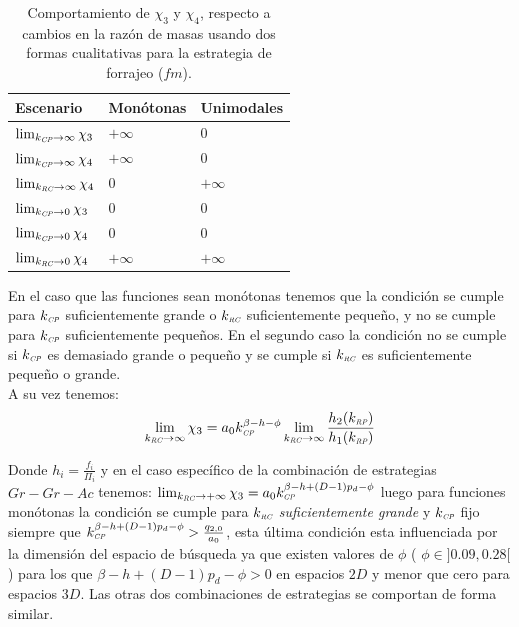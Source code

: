 \begin{table}

\caption{Comportamiento de $\chi_3$ y $\chi_4$, respecto a cambios en la raz\'on de masas usando dos formas cualitativas para la estrategia de forrajeo ($fm$).}
\begin{center}
\begin{tabular}{p{1.5in}|m{1.5in}|m{1.5in}} 
 Escenario & Mon\'otonas  & Unimodales \\
\hline
$\lim_{k_{\textit{\tiny CP}} \to \infty} \chi_3$ & $+\infty$  & 0 \\
$\lim_{k_{\textit{\tiny CP}} \to \infty} \chi_4$ & $+\infty$  & 0 \\
$\lim_{k_{\textit{\tiny RC}} \to \infty} \chi_4$ & 0  & $+\infty$ \\
$\lim_{k_{\textit{\tiny CP}} \to 0} \chi_3$ & 0 & 0 \\
$\lim_{k_{\textit{\tiny CP}} \to 0} \chi_4$ & 0 & 0 \\
$\lim_{k_{\textit{\tiny RC}} \to 0} \chi_4$ & $+\infty$ & $+\infty$ \\
\hline

\end{tabular}
\end{center}
\end{table}

En el caso que las funciones sean mon\'otonas tenemos que la condici\'on se cumple para $k_{\textit{\tiny CP}}$ suficientemente grande o  $k_{\textit{\tiny RC}}$ suficientemente peque\~no, y no se cumple para $k_{\textit{\tiny CP}}$ suficientemente peque\~nos. En el segundo caso la condici\'on no se cumple si $k_{\textit{\tiny CP}}$ es demasiado grande o peque\~no y se cumple si $k_{\textit{\tiny RC}}$ es suficientemente peque\~no o grande.\\

A su vez tenemos:
\begin{equation}
  \lim_{k_{\textit{\tiny RC}} \to \infty} \chi_3 = a_0 k_{\textit{\tiny CP}}^{\beta - h - \phi} \lim_{k_{\textit{\tiny RC}} \to \infty} \frac{h_2(k_{\textit{\tiny RP}})}{h_1(k_{\textit{\tiny RP}})} 
\end{equation}

Donde $h_i = \frac{f_i}{\Pi_i}$ y en el caso espec\'ifico de la combinaci\'on de estrategias $Gr-Gr-Ac$ tenemos: $\lim_{k_{\textit{\tiny RC}} \to +\infty} \chi_3 = a_0 k_{\textit{\tiny CP}}^{\beta -h + (D-1)p_d - \phi}$ luego para funciones mon\'otonas la condici\'on se cumple para $k_{\textit{\tiny RC}}$ \emph{suficientemente grande} y $k_{\textit{\tiny CP}}$ fijo siempre que $k_{\textit{\tiny CP}}^{\beta - h + (D-1)p_d - \phi} > \frac{q_{2,0}}{a_0}$, esta \'ultima condici\'on esta influenciada por la dimensi\'on del espacio de b\'usqueda ya que existen valores de $\phi$ ( $\phi \in ]0.09, 0.28[$) para los que $ \beta - h + (D-1)p_d - \phi >0$ en espacios $2D$ y menor que cero para espacios $3D$. Las otras dos combinaciones de estrategias se comportan de forma similar.\\

